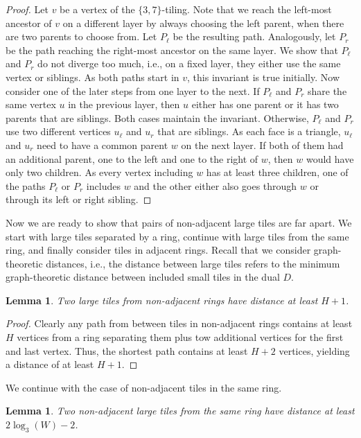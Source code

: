 \documentclass[11pt]{article}
\newtheorem{lemma}[theorem]{Lemma}
\begin{document}
\begin{proof}
    Let $v$ be a vertex of the $\{3, 7\}$-tiling.
    Note that we reach the left-most ancestor of $v$ on a different layer by always choosing the left parent, when there are two parents to choose from.
    Let $P_\ell$ be the resulting path.
    Analogously, let $P_r$ be the path reaching the right-most ancestor on the same layer.
    We show that $P_\ell$ and $P_r$ do not diverge too much, i.e., on a fixed layer, they either use the same vertex or siblings.
    As both paths start in $v$, this invariant is true initially.
    Now consider one of the later steps from one layer to the next.
    If $P_\ell$ and $P_r$ share the same vertex $u$ in the previous layer, then $u$ either has one parent or it has two parents that are siblings.
    Both cases maintain the invariant.
    Otherwise, $P_\ell$ and $P_r$ use two different vertices $u_\ell$ and $u_r$ that are siblings.
    As each face is a triangle, $u_\ell$ and $u_r$ need to have a common parent $w$ on the next layer.
    If both of them had an additional parent, one to the left and one to the right of $w$, then $w$ would have only two children.
    As every vertex including $w$ has at least three children, one of the paths $P_\ell$ or $P_r$ includes $w$ and the other either also goes through $w$ or through its left or right sibling.
\end{proof}
%
Now we are ready to show that pairs of non-adjacent large tiles are far apart.
We start with large tiles separated by a ring, continue with large tiles from the same ring, and finally consider tiles in adjacent rings.
Recall that we consider graph-theoretic distances, i.e., the distance between large tiles refers to the minimum graph-theoretic distance between included small tiles in the dual $D$.
%
\begin{lemma}
    \label{lem:tiling_large_r_non_adj_rings}
    Two large tiles from non-adjacent rings have distance at least $H + 1$.
\end{lemma}
\begin{proof}
    Clearly any path from between tiles in non-adjacent rings contains at least $H$ vertices from a ring separating them plus tow additional vertices for the first and last vertex.
    Thus, the shortest path contains at least $H + 2$ vertices, yielding a distance of at least $H + 1$.
\end{proof}
%
We continue with the case of non-adjacent tiles in the same ring.
%
\begin{lemma}
    \label{lem:tiling_large_r_same_ring}
    Two non-adjacent large tiles from the same ring have distance at least $2\log_3(W) - 2$.
\end{lemma}
\end{document}
